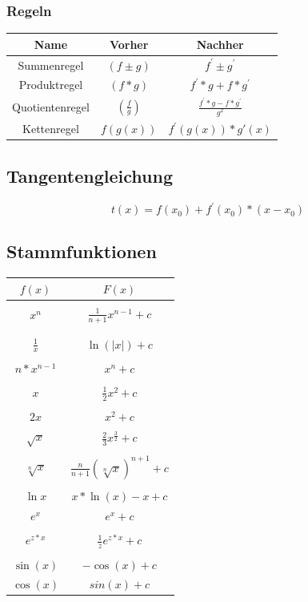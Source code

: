 \documentclass[12pt,a4paper]{article}
\begin{document}
		\subsubsection{Regeln}
			\begin{tabular}{|c|c|c|}
				 \hline
				Name & Vorher & Nachher \\
				\hline
				Summenregel & $(f\pm g)$ & $f^{'} \pm g^{'}$ \\
				\hline
				Produktregel & $(f*g)$ & $f^{'} *g + f* g^{'}$ \\
				\hline
				Quotientenregel & $(\frac{f}{g})$ & $\frac{f^{'}*g-f*g^{'}}{g^{2}}$ \\
				\hline
				Kettenregel & $f(g(x))$ & $f^{'}(g(x))*g'(x)$ \\
				\hline
			\end{tabular}

	\subsection{Tangentengleichung}
		$$t(x) = f(x_{0}) +f^{'}(x_{0})*(x-x_{0})$$

	\subsection{Stammfunktionen}
			\begin{tabular}{c|c}
				 \hline
				$f(x)$ & $F(x)$ \\
				\hline\\
				$x^{n}$ & $\frac{1}{n+1}x^{n-1}+c$ \\\\
				\hline\\
				$\frac{1}{x}$ & $\ln{(|x|)}+c$ \\\\
				\hline
				$n*x^{n-1}$ & $x^n + c$\\
				\hline\\
				$x$ & $\frac{1}{2}x^2+c$\\\\
				\hline
				$2x$ & $x^2+c$\\
				\hline
				$\sqrt{x}$ & $\frac{2}{3}x^{\frac{3}{2}} + c$\\
				\hline\\
				$\sqrt[n]{x}$ & $\frac{n}{n+1}(\sqrt[n]{x})^{n+1} + c$\\\\
				\hline
				$\ln{x}$ & $x*\ln{(x)} -x + c$\\
				\hline
				$e^x$ & $e^x + c$\\
				\hline\\
				$e^{z*x}$ & $\frac{1}{z}e^{z*x} + c$\\\\
				\hline
				$\sin{(x)}$ & $-\cos{(x)}+ c$\\
				\hline
				$\cos{(x)}$ & $sin{(x)} + c$\\
			\end{tabular}
\end{document}
